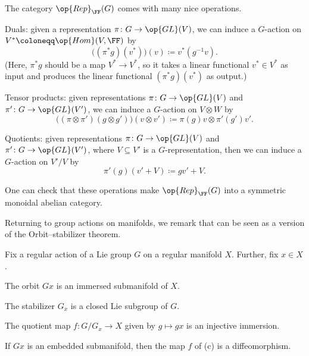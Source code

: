 \documentclass[../notes.tex]{subfiles}
\begin{document}
\begin{remark}
	The category $\op{Rep}_{\FF}(G)$ comes with many nice operations.
	\begin{listalph}
		\item Duals: given a representation $\pi\colon G\to\op{GL}(V)$, we can induce a $G$-action on $V^*\coloneqq\op{Hom}(V,\FF)$ by
		\[\big((\pi^*g)(v^*)\big)(v)\coloneqq v^*\left(g^{-1}v\right).\]
		(Here, $\pi^*g$ should be a map $V^*\to V^*$, so it takes a linear functional $v^*\in V^*$ as input and produces the linear functional $(\pi^*g)(v^*)$ as output.)
		\item Tensor products: given representations $\pi\colon G\to\op{GL}(V)$ and $\pi'\colon G\to\op{GL}(V')$, we can induce a $G$-action on $V\otimes W$ by
		\[\big((\pi\otimes\pi')(g\otimes g')\big)(v\otimes v')\coloneqq\pi(g)v\otimes\pi'(g')v'.\]
		\item Quotients: given representations $\pi\colon G\to\op{GL}(V)$ and $\pi'\colon G\to\op{GL}(V')$, where $V\subseteq V'$ is a $G$-representation, then we can induce a $G$-action on $V'/V$ by
		\[\pi'(g)(v'+V)\coloneqq gv'+V.\]
	\end{listalph}
	One can check that these operations make $\op{Rep}_{\FF}(G)$ into a symmetric monoidal abelian category.
\end{remark}
Returning to group actions on manifolds, we remark that  can be seen as a version of the Orbit--stabilizer theorem.
\begin{theorem} \label{thm:orb-stab}
	Fix a regular action of a Lie group $G$ on a regular manifold $X$. Further, fix $x\in X$.
	\begin{listalph}
		\item The orbit $Gx$ is an immersed submanifold of $X$.
		\item The stabilizer $G_x$ is a closed Lie subgroup of $G$.
		\item The quotient map $f\colon G/G_x\to X$ given by $g\mapsto gx$ is an injective immersion.
		\item If $Gx$ is an embedded submanifold, then the map $f$ of (c) is a diffeomorphism.
	\end{listalph}
\end{theorem}
\end{document}
